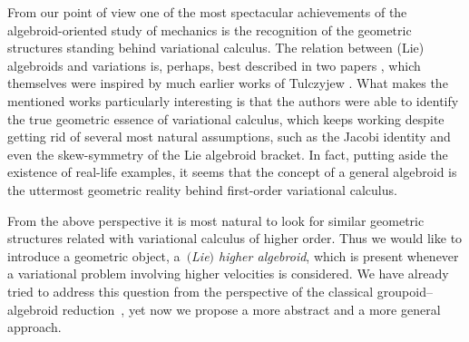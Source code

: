 \documentclass[10pt,a4paper]{amsart}
\numberwithin{equation}{section}
\theoremstyle{definition}
\begin{document}
From our point of view one of the most spectacular achievements of the algebroid-oriented study of mechanics is the recognition of the geometric structures standing behind variational calculus. The relation between (Lie) algebroids and variations is, perhaps, best described in two papers \cite{GG_var_calc_gen_alg_2008, GGU_geom_mech_alg_2006}, which themselves were inspired by much earlier works of Tulczyjew \cite{Tulczyjew_1976,Tulczyjew_1976a}. What makes the mentioned works particularly interesting is that the authors were able to identify the true geometric essence of variational calculus, which keeps working despite getting rid of several most natural assumptions, such as the Jacobi identity and even the skew-symmetry of the Lie algebroid bracket. In fact, putting aside the existence of real-life examples, it seems that the concept of a general algebroid \cite{JG_PU_Lie_alg_P-N_str_1997, JG_PU_Algebroids_1999} is the uttermost geometric reality behind first-order variational calculus.

From the above perspective it is most natural to look for similar geometric structures related with variational calculus of higher order. Thus we would like to introduce a geometric object, a~\emph{$($Lie$)$ higher algebroid}, which is present whenever a variational problem involving higher velocities is considered. We have already tried to address this question from the perspective of the classical groupoid--algebroid reduction~\cite{MJ_MR_models_high_alg_2015}, yet now we propose a more abstract and a more general approach.
\end{document}
